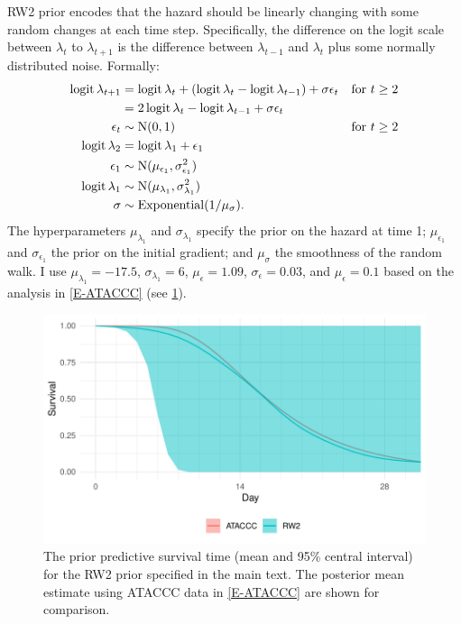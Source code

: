 \documentclass[thesis.tex]{subfiles}
\begin{document}
RW2 prior encodes that the hazard should be linearly changing with some random changes at each time step.
Specifically, the difference on the logit scale between $\lambda_t$ to $\lambda_{t+1}$ is the difference between $\lambda_{t-1}$ and $\lambda_t$ plus some normally distributed noise.
Formally:
\begin{align}
  \operatorname{logit}\lambda_{t+1}
  &= \operatorname{logit}\lambda_t + (\operatorname{logit}\lambda_t - \operatorname{logit}\lambda_{t-1}) + \sigma \epsilon_t &\text{for $t \geq 2$} \\
  &= 2\operatorname{logit}\lambda_t - \operatorname{logit}\lambda_{t-1} + \sigma \epsilon_t \\
  \epsilon_t &\sim \operatorname{N}(0, 1) &\text{for $t \geq 2$}  \\
  \operatorname{logit}\lambda_2 &= \operatorname{logit}\lambda_1 + \epsilon_1 \\\
  \epsilon_1 &\sim \operatorname{N}(\mu_{\epsilon_1}, \sigma_{\epsilon_1}^2) \\
  \operatorname{logit} \lambda_1 &\sim \operatorname{N}(\mu_{\lambda_1}, \sigma_{\lambda_1}^2) \\
  \sigma &\sim \operatorname{Exponential}(1/\mu_\sigma).
\end{align}
The hyperparameters $\mu_{\lambda_1}$ and $\sigma_{\lambda_1}$ specify the prior on the hazard at time 1; $\mu_{\epsilon_1}$ and $\sigma_{\epsilon_1}$ the prior on the initial gradient; and $\mu_\sigma$ the smoothness of the random walk.
I use $\mu_{\lambda_1} = -17.5$, $\sigma_{\lambda_1} = 6$, $\mu_\epsilon = 1.09$, $\sigma_\epsilon = 0.03$, and $\mu_\epsilon = 0.1$ based on the analysis in \cref{E-ATACCC} (see \cref{perf-test:fig:rw2-prior}).
\begin{figure}
  \centering \includegraphics{cis-perfect-testing/rw2-prior}
  \caption[RW2 prior for the hazard]{The prior predictive survival time (mean and 95\% central interval) for the RW2 prior specified in the main text. The posterior mean estimate using ATACCC data in \cref{E-ATACCC} are shown for comparison. \label{perf-test:fig:rw2-prior}}
\end{figure}
\end{document}
